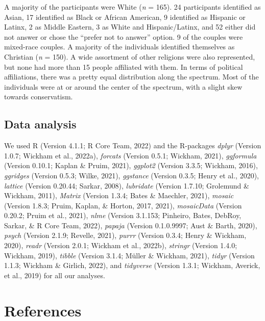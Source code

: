 \documentclass[
  english,
  man]{apa6}
\begin{document}
A majority of the participants were White (\emph{n} = 165). 24 participants identified as Asian, 17 identified as Black or African American, 9 identified as Hispanic or Latinx, 2 as Middle Eastern, 3 as White and Hispanic/Latinx, and 52 either did not answer or chose the \enquote{prefer not to answer} option. 9 of the couples were mixed-race couples. A majority of the individuals identified themselves as Christian (\emph{n} = 150). A wide assortment of other religions were also represented, but none had more than 15 people affiliated with them. In terms of political affiliations, there was a pretty equal distribution along the spectrum. Most of the individuals were at or around the center of the spectrum, with a slight skew towards conservatism.

\hypertarget{data-analysis}{%
\subsection{Data analysis}\label{data-analysis}}

We used R (Version 4.1.1; R Core Team, 2022) and the R-packages \emph{dplyr} (Version 1.0.7; Wickham et al., 2022a), \emph{forcats} (Version 0.5.1; Wickham, 2021), \emph{ggformula} (Version 0.10.1; Kaplan \& Pruim, 2021), \emph{ggplot2} (Version 3.3.5; Wickham, 2016), \emph{ggridges} (Version 0.5.3; Wilke, 2021), \emph{ggstance} (Version 0.3.5; Henry et al., 2020), \emph{lattice} (Version 0.20.44; Sarkar, 2008), \emph{lubridate} (Version 1.7.10; Grolemund \& Wickham, 2011), \emph{Matrix} (Version 1.3.4; Bates \& Maechler, 2021), \emph{mosaic} (Version 1.8.3; Pruim, Kaplan, \& Horton, 2017, 2021), \emph{mosaicData} (Version 0.20.2; Pruim et al., 2021), \emph{nlme} (Version 3.1.153; Pinheiro, Bates, DebRoy, Sarkar, \& R Core Team, 2022), \emph{papaja} (Version 0.1.0.9997; Aust \& Barth, 2020), \emph{psych} (Version 2.1.9; Revelle, 2021), \emph{purrr} (Version 0.3.4; Henry \& Wickham, 2020), \emph{readr} (Version 2.0.1; Wickham et al., 2022b), \emph{stringr} (Version 1.4.0; Wickham, 2019), \emph{tibble} (Version 3.1.4; Müller \& Wickham, 2021), \emph{tidyr} (Version 1.1.3; Wickham \& Girlich, 2022), and \emph{tidyverse} (Version 1.3.1; Wickham, Averick, et al., 2019) for all our analyses.

\newpage

\hypertarget{references}{%
\section{References}\label{references}}
\end{document}

